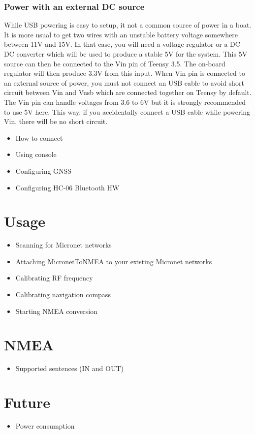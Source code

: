 \documentclass{report}
\begin{document}
\subsection{Power with an external DC source}
While USB powering is easy to setup, it not a common source of power in a boat. It is more usual to get two wires with an unstable battery voltage somewhere between 11V and 15V. In that case, you will need a voltage regulator or a DC-DC converter which will be used to produce a stable 5V for the system. This 5V source can then be connected to the Vin pin of Teensy 3.5. The on-board regulator will then produce 3.3V from this input.
\linebreak
When Vin pin is connected to an external source of power, you must not connect an USB cable to avoid short circuit between Vin and Vusb which are connected together on Teensy by default. The Vin pin can handle voltages from 3.6 to 6V but it is strongly recommended to use 5V here. This way, if you accidentally connect a USB cable while powering Vin, there will be no short circuit.

\begin{itemize}
\item How to connect
\item Using console
\item Configuring GNSS
\item Configuring HC-06 Bluetooth HW
\end{itemize}

\chapter{Usage}

\begin{itemize}
\item Scanning for Micronet networks
\item Attaching MicronetToNMEA to your existing Micronet networks
\item Calibrating RF frequency
\item Calibrating navigation compass
\item Starting NMEA conversion
\end{itemize}

\chapter{NMEA}

\begin{itemize}
\item Supported sentences (IN and OUT)
\end{itemize}

\chapter{Future}

\begin{itemize}
\item Power consumption
\end{itemize}
\end{document}

